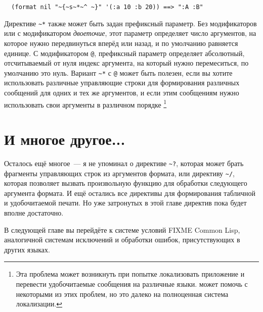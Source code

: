\begin{verbatim}
  (format nil "~{~s~*~^ ~}" '(:a 10 :b 20)) ==> ":A :B"
\end{verbatim}

Директиве \lstinline!~*! также может быть задан префиксный параметр. Без модификаторов или
с модификатором \textit{двоеточие}, этот параметр определяет число аргументов, на которое
нужно передвинуться вперёд или назад, и по умолчанию равняется единице. С модификатором
\lstinline!@!, префиксный параметр определяет абсолютный, отсчитываемый от нуля индекс
аргумента, на который нужно перемеситься, по умолчанию это нуль. Вариант \lstinline!~*! с
\lstinline!@! может быть полезен, если вы хотите использовать различные управляющие строки
для формирования различных сообщений для одних и тех же аргументов, и если этим сообщениям
нужно использовать свои аргументы в различном порядке \footnote{Эта проблема может
  возникнуть при попытке локализовать приложение и перевести удобочитаемые сообщения на
  различные языки.  может помочь с некоторыми из этих проблем, но это далеко
  на полноценная система локализации.}

\section{И многое другое...}

Осталось ещё многое~--- я не упоминал о директиве \lstinline!~?!, которая может брать
фрагменты управляющих строк из аргументов формата, или директиву \lstinline!~/!, которая
позволяет вызвать произвольную функцию для обработки следующего аргумента формата. И ещё
остались все директивы для формирования табличной и удобочитаемой печати. Но уже
затронутых в этой главе директив пока будет вполне достаточно.

В следующей главе вы перейдёте к системе условий FIXME Common Lisp, аналогичной системам
исключений и обработки ошибок, присутствующих в других языках.



